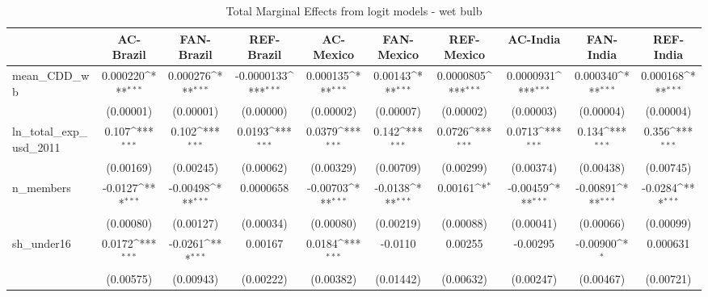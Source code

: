 \begin{table}[htbp]\centering
\def\sym#1{\ifmmode^{#1}\else\(^{#1}\)\fi}
\caption{Total Marginal Effects from logit models - wet bulb}
\begin{tabular}{l*{9}{c}}
\hline\hline
            &\multicolumn{1}{c}{AC-Brazil}&\multicolumn{1}{c}{FAN-Brazil}&\multicolumn{1}{c}{REF-Brazil}&\multicolumn{1}{c}{AC-Mexico}&\multicolumn{1}{c}{FAN-Mexico}&\multicolumn{1}{c}{REF-Mexico}&\multicolumn{1}{c}{AC-India}&\multicolumn{1}{c}{FAN-India}&\multicolumn{1}{c}{REF-India}\\
\hline
mean\_CDD\_wb &    0.000220\sym{***}&    0.000276\sym{***}&  -0.0000133\sym{***}&    0.000135\sym{***}&     0.00143\sym{***}&   0.0000805\sym{***}&   0.0000931\sym{***}&    0.000340\sym{***}&    0.000168\sym{***}\\
            &   (0.00001)         &   (0.00001)         &   (0.00000)         &   (0.00002)         &   (0.00007)         &   (0.00002)         &   (0.00003)         &   (0.00004)         &   (0.00004)         \\
ln\_total\_exp\_usd\_2011&       0.107\sym{***}&       0.102\sym{***}&      0.0193\sym{***}&      0.0379\sym{***}&       0.142\sym{***}&      0.0726\sym{***}&      0.0713\sym{***}&       0.134\sym{***}&       0.356\sym{***}\\
            &   (0.00169)         &   (0.00245)         &   (0.00062)         &   (0.00329)         &   (0.00709)         &   (0.00299)         &   (0.00374)         &   (0.00438)         &   (0.00745)         \\
n\_members   &     -0.0127\sym{***}&    -0.00498\sym{***}&   0.0000658         &    -0.00703\sym{***}&     -0.0138\sym{***}&     0.00161\sym{*}  &    -0.00459\sym{***}&    -0.00891\sym{***}&     -0.0284\sym{***}\\
            &   (0.00080)         &   (0.00127)         &   (0.00034)         &   (0.00080)         &   (0.00219)         &   (0.00088)         &   (0.00041)         &   (0.00066)         &   (0.00099)         \\
sh\_under16  &      0.0172\sym{***}&     -0.0261\sym{***}&     0.00167         &      0.0184\sym{***}&     -0.0110         &     0.00255         &    -0.00295         &    -0.00900\sym{*}  &    0.000631         \\
            &   (0.00575)         &   (0.00943)         &   (0.00222)         &   (0.00382)         &   (0.01442)         &   (0.00632)         &   (0.00247)         &   (0.00467)         &   (0.00721)         \\

\end{tabular}
\end{table}
